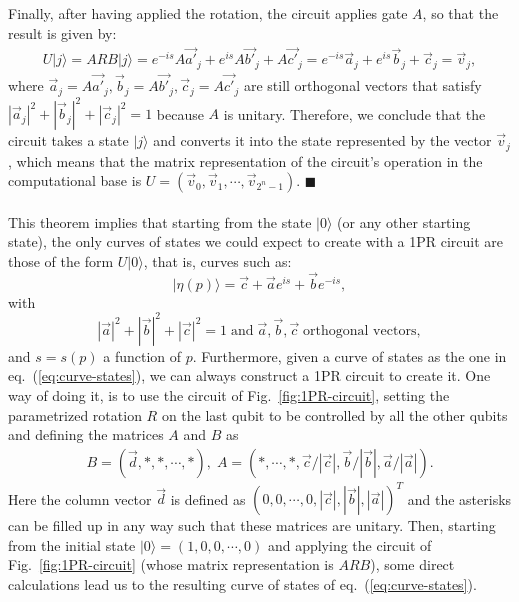 \documentclass[10pt,letterpaper]{article} %
\newcommand{\fref}[1]{Fig.~\ref{#1}}
\newcommand{\eref}[1]{eq.~(\ref{#1})}
\begin{document}
Finally, after having applied the rotation, the circuit applies gate $A$, 
so that the result is given by:
\begin{eqnarray}
U|j\rangle = ARB|j\rangle = e^{-is} A \vec{a'}_j + e^{is} A \vec{b'}_j + A \vec{c'}_j = e^{-is} \vec{a}_j + e^{is} \vec{b}_j + \vec{c}_j = \vec{v}_j,
\end{eqnarray}
where $\vec{a}_j = A \vec{a'}_j , \vec{b}_j = A \vec{b'}_j , \vec{c}_j = A \vec{c'}_j$ are still orthogonal
vectors that satisfy $|\vec{a}_j|^2 + |\vec{b}_j|^2 + |\vec{c}_j|^2 = 1$ because $A$ is unitary. 
Therefore, we conclude that the circuit takes a state $|j\rangle$ and converts it
 into the state represented by the vector $\vec{v}_j$, which means that the matrix representation of the circuit's operation in the 
computational base is
 $U = (\vec{v}_0, \vec{v}_1, \cdots, \vec{v}_{2^n-1})$. $\blacksquare$  \\
 $\;$ \\
 
This theorem implies that starting from the state $|0\rangle$ (or any 
other starting state),
the only curves of states we could expect to create
with a 1PR circuit are those of the form $U|0\rangle$, that is, curves such as:
\begin{equation}
|\eta(p)\rangle = \vec{c} + \vec{a} e^{is} + \vec{b} e^{-is},
\label{eq:curve-states}
\end{equation}
with 
\begin{equation}
|\vec{a}|^2 + |\vec{b}|^2 + |\vec{c}|^2 = 1  \; \text{and} \; \vec{a}, \vec{b}, \vec{c} \; \text{orthogonal vectors},
\label{eq:conditions-vecs}
\end{equation}
and $s = s(p)$ a function of $p$.
Furthermore, given a curve of states as the one in
\eref{eq:curve-states}, we can always construct a 1PR circuit to create it.
One way of doing it, is to use the circuit of \fref{fig:1PR-circuit}, setting the parametrized
rotation $R$ on the last qubit to be controlled by all the other qubits
and defining the matrices $A$ and $B$ as
\begin{align*}
B = (\vec{d}, *,*, \cdots,*), \; 
A = (* , \cdots, *, \vec{c}/|\vec{c}|, \vec{b}/|\vec{b}|, \vec{a}/|\vec{a}|).
\end{align*}
Here the column vector $\vec{d}$ is defined as 
$(0,0, \cdots,0 ,|\vec{c}|, |\vec{b}|, |\vec{a}|)^T$
and the asterisks can be filled up in any
way such that these matrices are unitary.
Then, starting from the initial state $|0\rangle = (1,0,0,\cdots,0)$
and applying the circuit  of \fref{fig:1PR-circuit} (whose matrix representation is $ARB$), some direct calculations lead us  to 
the resulting curve of states
of \eref{eq:curve-states}.
\end{document}

